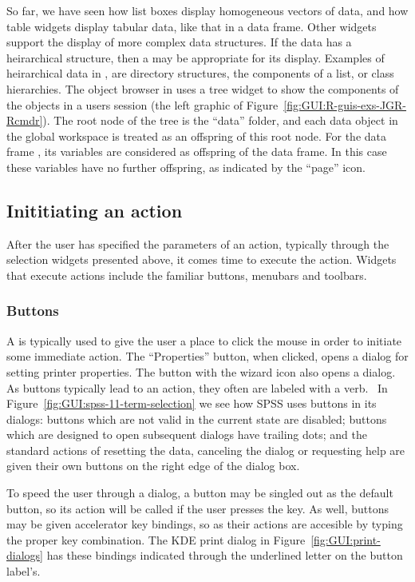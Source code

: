 So far, we have seen how list boxes display homogeneous vectors of
data, and how table widgets display tabular data, like that in a data
frame. Other widgets support the display of more complex data
structures. If the data has a heirarchical structure, then a  may be appropriate for its display. Examples of heirarchical
data in \R, are directory structures, the components of a list, or
class hierarchies. The object browser in  uses a tree
widget to show the components of the objects in a users session (the
left graphic of Figure~\ref{fig:GUI:R-guis-exs-JGR-Rcmdr}). The root
node of the tree is the ``data'' folder, and each data object in the
global workspace is treated as an offspring of this root node. For the
data frame , its variables are considered as offspring of
the data frame. In this case these variables have no further
offspring, as indicated by the ``page'' icon.


\subsection{Inititiating an action}

After the user has specified the parameters of an action, typically
through the selection widgets presented above, it comes time to
execute the action. Widgets that execute actions include the familiar
buttons, menubars and toolbars.


\subsubsection{Buttons}
\label{sec:GUI:buttons}

A  is typically used to give the user a place to click the
mouse in order to initiate some immediate action. The ``Properties''
button, when clicked, opens a dialog for setting printer
properties. The button with the wizard icon also opens a dialog.  As
buttons typically lead to an action, they often are labeled with a
verb.~\citep{APPLE:HIG} In Figure~\ref{fig:GUI:spss-11-term-selection}
we see how SPSS uses buttons in its dialogs: buttons which are not
valid in the current state are disabled; buttons which are designed to open
subsequent dialogs have trailing dots; and the standard actions of
resetting the data, canceling the dialog or requesting help are given
their own buttons on the right edge of the dialog box.  

To speed the user through a dialog, a button may be singled out as the
default button, so its action will be called if the user presses the
 key. As well, buttons may be given accelerator key
bindings, so as their actions are accesible by typing the proper key
combination. The KDE print dialog in
Figure~\ref{fig:GUI:print-dialogs} has these bindings indicated
through the underlined letter on the button label's.

